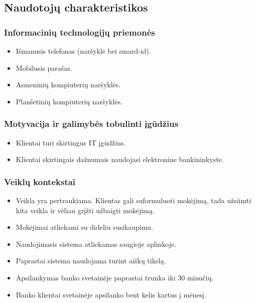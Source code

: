 \documentclass{VUMIFPSkursinis}
\begin{document}
\subsection{Naudotojų charakteristikos}
\subsubsection{Informacinių technologijų priemonės}
\begin{itemize}
	\item Išmanusis telefonas (naršyklė bei smard-id).
	\item Mobilusis parašas.
	\item Asmeninių kompiuterių naršyklės.
	\item Planšetinių kompiuterių naršyklės.
\end{itemize}
\subsubsection{Motyvacija ir galimybės tobulinti įgūdžius}
\begin{itemize}
	\item Klientai turi skirtingus IT įgūdžius.
	\item Klientai skirtingais dažnumais naudojasi elektronine bankininkyste.
\end{itemize}
\subsubsection{Veiklų kontekstai}
\begin{itemize}
	\item Veikla yra pertraukiama. Klientas gali suformuluoti mokėjimą, tada užsiimti kita veikla ir vėliau grįžti užbaigti mokėjimą.
	\item Mokėjimai atliekami su dideliu susikaupimu.
	\item Naudojimasis sistema atliekamas saugioje aplinkoje.
	\item Paprastai sistema naudojama turint aiškų tikslą.
	\item Apsilankymas banko svetainėje paprastai trunka iki 30 minučių.
	\item Banko klientai svetainėje apsilanko bent kelis kartus į mėnesį.
\end{itemize}
\end{document}

